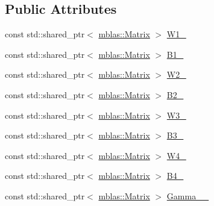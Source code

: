 \subsection*{Public Attributes}
\begin{DoxyCompactItemize}
\item 
const std\+::shared\+\_\+ptr$<$ \hyperlink{namespaceamunmt_1_1GPU_1_1mblas_ab67821a8254de53e45a623cf73c0aef6}{mblas\+::\+Matrix} $>$ \hyperlink{structamunmt_1_1GPU_1_1Weights_1_1DecSoftmax_abb369b3ad25c44af574478b232eb6c9b}{W1\+\_\+}
\item 
const std\+::shared\+\_\+ptr$<$ \hyperlink{namespaceamunmt_1_1GPU_1_1mblas_ab67821a8254de53e45a623cf73c0aef6}{mblas\+::\+Matrix} $>$ \hyperlink{structamunmt_1_1GPU_1_1Weights_1_1DecSoftmax_a89de082b62b2f4b8e4a3218100191c81}{B1\+\_\+}
\item 
const std\+::shared\+\_\+ptr$<$ \hyperlink{namespaceamunmt_1_1GPU_1_1mblas_ab67821a8254de53e45a623cf73c0aef6}{mblas\+::\+Matrix} $>$ \hyperlink{structamunmt_1_1GPU_1_1Weights_1_1DecSoftmax_a0ed119030e1d4a42e1cbabc8a5606d18}{W2\+\_\+}
\item 
const std\+::shared\+\_\+ptr$<$ \hyperlink{namespaceamunmt_1_1GPU_1_1mblas_ab67821a8254de53e45a623cf73c0aef6}{mblas\+::\+Matrix} $>$ \hyperlink{structamunmt_1_1GPU_1_1Weights_1_1DecSoftmax_af1abfc82b60f11afeb544bff95e0dc21}{B2\+\_\+}
\item 
const std\+::shared\+\_\+ptr$<$ \hyperlink{namespaceamunmt_1_1GPU_1_1mblas_ab67821a8254de53e45a623cf73c0aef6}{mblas\+::\+Matrix} $>$ \hyperlink{structamunmt_1_1GPU_1_1Weights_1_1DecSoftmax_a26f826f4efcff85ca10f3ba3414f4020}{W3\+\_\+}
\item 
const std\+::shared\+\_\+ptr$<$ \hyperlink{namespaceamunmt_1_1GPU_1_1mblas_ab67821a8254de53e45a623cf73c0aef6}{mblas\+::\+Matrix} $>$ \hyperlink{structamunmt_1_1GPU_1_1Weights_1_1DecSoftmax_a32f075c1adcc86d06031ea5a9239ca6c}{B3\+\_\+}
\item 
const std\+::shared\+\_\+ptr$<$ \hyperlink{namespaceamunmt_1_1GPU_1_1mblas_ab67821a8254de53e45a623cf73c0aef6}{mblas\+::\+Matrix} $>$ \hyperlink{structamunmt_1_1GPU_1_1Weights_1_1DecSoftmax_ab63526171f9ce507a531e9981aca46d4}{W4\+\_\+}
\item 
const std\+::shared\+\_\+ptr$<$ \hyperlink{namespaceamunmt_1_1GPU_1_1mblas_ab67821a8254de53e45a623cf73c0aef6}{mblas\+::\+Matrix} $>$ \hyperlink{structamunmt_1_1GPU_1_1Weights_1_1DecSoftmax_af977c664f447f9be7e9e5012f150512a}{B4\+\_\+}
\item 
const std\+::shared\+\_\+ptr$<$ \hyperlink{namespaceamunmt_1_1GPU_1_1mblas_ab67821a8254de53e45a623cf73c0aef6}{mblas\+::\+Matrix} $>$ \hyperlink{structamunmt_1_1GPU_1_1Weights_1_1DecSoftmax_a63a49f9647e63f4025784073d7208119}{Gamma\+\_\+\_\+}

\end{DoxyCompactItemize}
